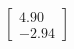 \documentclass[preview]{standalone}
\begin{document}
\begin{align*}
\begin{bmatrix} 4.90 \\ -2.94 \end{bmatrix}
\end{align*}
\end{document}
